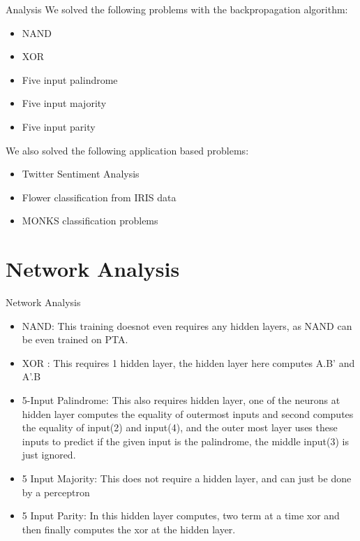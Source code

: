 \documentclass{beamer}
\begin{document}
\begin{frame}{Analysis}
We solved the following problems with the backpropagation algorithm:
\begin{itemize}
	\item NAND
    \item XOR
    \item Five input palindrome
    \item Five input majority
    \item Five input parity 
    \newline
\end{itemize}

We also solved the following application based problems:

\begin{itemize}
	\item Twitter Sentiment Analysis
    \item Flower classification from IRIS data
    \item MONKS classification problems
    \newline
\end{itemize}
\end{frame}

\section{Network Analysis}
    
\begin{frame}[fragile]{Network Analysis}
	\begin{itemize}
    	\item NAND: This training doesnot even requires any hidden layers, as NAND can be even trained on PTA.
   		\item XOR : This requires 1 hidden layer, the hidden layer here computes A.B' and A'.B
        \item 5-Input Palindrome: This also requires hidden layer, one of the neurons at hidden layer computes the equality of outermost inputs and second computes the equality of input(2) and input(4), and the outer most layer uses these inputs to predict if the given input is the palindrome, the middle input(3) is just ignored.
        \item 5 Input Majority: This does not require a hidden layer, and can just be done by a perceptron
        \item 5 Input Parity: In this hidden layer computes, two term at a time xor and then finally computes the xor at the hidden layer.
     \end{itemize}
\end{frame}
\end{document}
